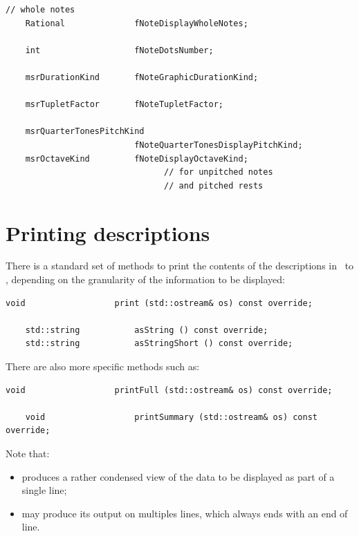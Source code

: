 \begin{lstlisting}[language=CPlusPlus]
    // whole notes
    Rational              fNoteDisplayWholeNotes;

    int                   fNoteDotsNumber;

    msrDurationKind       fNoteGraphicDurationKind;

    msrTupletFactor       fNoteTupletFactor;

    msrQuarterTonesPitchKind
                          fNoteQuarterTonesDisplayPitchKind;
    msrOctaveKind         fNoteDisplayOctaveKind;
                                // for unpitched notes
                                // and pitched rests
\end{lstlisting}


\section{Printing descriptions}\label{Printing descriptions}

There is a standard set of methods to print the contents of the descriptions in \mf\ to \standardOutput, depending on the granularity of the information to be displayed:
\begin{lstlisting}[language=CPlusPlus]
    void                  print (std::ostream& os) const override;

    std::string           asString () const override;
    std::string           asStringShort () const override;
\end{lstlisting}

There are also more specific methods such as:
\begin{lstlisting}[language=CPlusPlus]
    void                  printFull (std::ostream& os) const override;

    void                  printSummary (std::ostream& os) const override;
\end{lstlisting}

Note that:
\begin{itemize}
\item {} produces a rather condensed view of the data to be displayed as part of a single line;
\item {} may produce its output on multiples lines, which always ends with an end of line.
\end{itemize}

